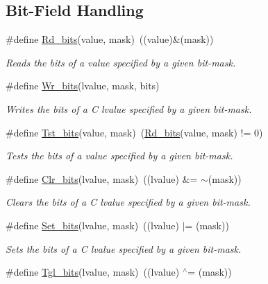 \subsection*{Bit-\/\-Field Handling}
\begin{DoxyCompactItemize}
\item 
\#define \hyperlink{group__group__xmega__utils_ga53d9294b7065346ffa04d7991d2bc31e}{Rd\-\_\-bits}(value, mask)~((value)\&(mask))
\begin{DoxyCompactList}\small\item\em Reads the bits of a value specified by a given bit-\/mask. \end{DoxyCompactList}\item 
\#define \hyperlink{group__group__xmega__utils_ga97b2bc0b5cdc7ec5293b7a5304cee0f0}{Wr\-\_\-bits}(lvalue, mask, bits)
\begin{DoxyCompactList}\small\item\em Writes the bits of a C lvalue specified by a given bit-\/mask. \end{DoxyCompactList}\item 
\#define \hyperlink{group__group__xmega__utils_gab1e92741077b101e6b2df74880e71e96}{Tst\-\_\-bits}(value, mask)~(\hyperlink{group__group__xmega__utils_ga53d9294b7065346ffa04d7991d2bc31e}{Rd\-\_\-bits}(value, mask) != 0)
\begin{DoxyCompactList}\small\item\em Tests the bits of a value specified by a given bit-\/mask. \end{DoxyCompactList}\item 
\#define \hyperlink{group__group__xmega__utils_gaffbccbb234075f838e181522c864605f}{Clr\-\_\-bits}(lvalue, mask)~((lvalue) \&= $\sim$(mask))
\begin{DoxyCompactList}\small\item\em Clears the bits of a C lvalue specified by a given bit-\/mask. \end{DoxyCompactList}\item 
\#define \hyperlink{group__group__xmega__utils_ga589436fa123e32e1063488ebd7fdc923}{Set\-\_\-bits}(lvalue, mask)~((lvalue) $|$=  (mask))
\begin{DoxyCompactList}\small\item\em Sets the bits of a C lvalue specified by a given bit-\/mask. \end{DoxyCompactList}\item 
\#define \hyperlink{group__group__xmega__utils_ga9f29d1e990286322697ae8d0f4e365e0}{Tgl\-\_\-bits}(lvalue, mask)~((lvalue) $^\wedge$=  (mask))

\end{DoxyCompactItemize}
